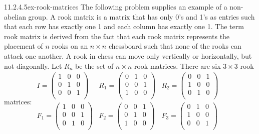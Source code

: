 \documentclass[twoside,10pt,]{book}
\numberwithin{equation}{section}
\begin{document}
\begin{divisionsolution}{11.2.4.5}{}{ex-rook-matrices}%
\hypertarget{p-3864}{}%
The following problem supplies an example of a non-abelian group. A rook matrix is a matrix that has only 0's and 1's as entries such that each row has exactly one 1 and each column has exactly one 1. The term rook matrix is derived from the fact that each rook matrix represents the placement of \(n\) rooks on an \(n\times n\) chessboard such that none of the rooks can attack one another. A rook in chess can move only vertically or horizontally, but not diagonally. Let \(R_n\) be the set of \(n\times n\) rook matrices. There are six \(3\times 3\) rook matrices: \(\begin{array}{ccc}
I=\left(
\begin{array}{ccc}
1 & 0 & 0 \\
0 & 1 & 0 \\
0 & 0 & 1 \\
\end{array}
\right) & R_1=\left(
\begin{array}{ccc}
0 & 1 & 0 \\
0 & 0 & 1 \\
1 & 0 & 0 \\
\end{array}
\right) & R_2=\left(
\begin{array}{ccc}
0 & 0 & 1 \\
1 & 0 & 0 \\
0 & 1 & 0 \\
\end{array}
\right) \\
F_1=\left(
\begin{array}{ccc}
1 & 0 & 0 \\
0 & 0 & 1 \\
0 & 1 & 0 \\
\end{array}
\right) & F_2=\left(
\begin{array}{ccc}
0 & 0 & 1 \\
0 & 1 & 0 \\
1 & 0 & 0 \\
\end{array}
\right) & F_3=\left(
\begin{array}{ccc}
0 & 1 & 0 \\
1 & 0 & 0 \\
0 & 0 & 1 \\
\end{array}
\right) \\
\end{array}\)\leavevmode%

\end{divisionsolution}
\end{document}
